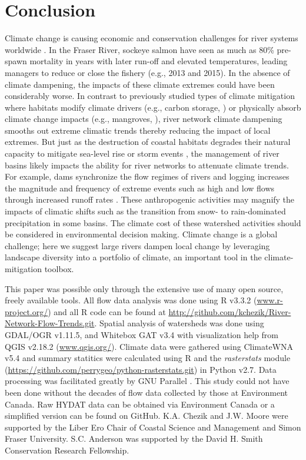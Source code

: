 \documentclass[draft,linenumbers]{AGUJournal}
\begin{document}
\section{Conclusion}

Climate change is causing economic and conservation challenges for river systems worldwide \citep{Palmer:2009,Pecl:2017}. In the Fraser River, sockeye salmon have seen as much as 80\% pre-spawn mortality in years with later run-off and elevated temperatures, leading managers to reduce or close the fishery (e.g., 2013 and 2015). In the absence of climate dampening, the impacts of these climate extremes could have been considerably worse. In contrast to previously studied types of climate mitigation where habitats modify climate drivers (e.g., carbon storage, \citep{Jones:2012}) or physically absorb climate change impacts (e.g., mangroves, \citep{Arkema:2013}), river network climate dampening smooths out extreme climatic trends thereby reducing the impact of local extremes. But just as the destruction of coastal habitats degrades their natural capacity to mitigate sea-level rise or storm events \citep{Arkema:2013}, the management of river basins likely impacts the ability for river networks to attenuate climate trends. For example, dams synchronize the flow regimes of rivers \citep{Poff:2007} and logging increases the magnitude and frequency of extreme events such as high and low flows through increased runoff rates \citep{Zhang:2014}. These anthropogenic activities may magnify the impacts of climatic shifts such as the transition from snow- to rain-dominated precipitation in some basins. The climate cost of these watershed activities should be considered in environmental decision making. Climate change is a global challenge; here we suggest large rivers dampen local change by leveraging landscape diversity into a portfolio of climate, an important tool in the climate-mitigation toolbox.


\acknowledgments
This paper was possible only through the extensive use of many open source, freely available tools. All flow data analysis was done using R v3.3.2 (\url{www.r-project.org/}) and all R code can be found at \url{http://github.com/kchezik/River-Network-Flow-Trends.git}. Spatial analysis of watersheds was done using GDAL/OGR v1.11.5, and Whitebox GAT v3.4 \citep{Lindsay:2016} with visualization help from QGIS v2.18.2 (\url{www.qgis.org/}). Climate data were gathered using ClimateWNA v5.4 \citep{Wang:2016} and summary statitics were calculated using R and the \textit{rasterstats} module (\url{https://github.com/perrygeo/python-rasterstats.git}) in Python v2.7. Data processing was facilitated greatly by GNU Parallel \citep{Tange2011a}. This study could not have been done without the decades of flow data collected by those at Environment Canada. Raw HYDAT data can be obtained via Environment Canada or a simplified version can be found on GitHub. K.A. Chezik and J.W. Moore were supported by the Liber Ero Chair of Coastal Science and Management and Simon Fraser University. S.C. Anderson was supported by the David H. Smith Conservation Research Fellowship.
\end{document}
